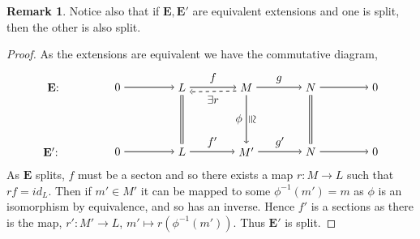 \documentclass[11.5pt, twoside, a4paper, titlepage]{report}
\theoremstyle{definition}
\newtheorem{rem}[mydef]{Remark}
\theoremstyle{plain}
\begin{document}
\begin{rem}
Notice also that if $\mathbf{E}, \mathbf{E'}$ are equivalent extensions and one is split, then the other is also split.
\end{rem}
\begin{proof}
As the extensions are equivalent we have the commutative diagram,
\begin{equation*}
\begin{tikzpicture}[->,-latex, auto, main path/.style={->, semithick}, main node/.style={}]
\node	[main node]		(1) at (0,0)		{$\mathbf{E}$:};
\node	[main node]		(2) at (2,0)		{$0$};
\node	[main node]		(3) at (4,0)		{$L$};
\node [main node]		(4) at (6,0)		{$M$};
\node [main node]		(5) at (8,0)		{$N$};
\node	[main node]		(11) at (10,0)	{$0$};

\node	[main node]		(6) at (0,-2)		{$\mathbf{E'}$: \quad};
\node	[main node]		(7) at (2,-2)		{$0$};
\node	[main node]		(8) at (4,-2)		{$L$};
\node [main node]		(9) at (6,-2)		{$M'$};
\node [main node]		(10) at (8,-2)	{$N$};
\node [main node]		(13) at (10,-2)	{$0$};

\draw (2) edge [main path] node [auto] {$$} (3);
\path (3.0) edge [main path] node [auto] {$f$} (4.180);
\path (4.200) edge [dashed, ->, semithick] node [auto] {$\exists r$} (3.330);
\draw (4) edge [main path] node [auto] {$g$} (5);
\draw (5) edge [main path] (11);


\draw (7) edge [main path] node [auto] {$$} (8);
\draw (8) edge [main path] node [auto] {$f'$} (9);
\draw (9) edge [main path] node [auto] {$g'$} (10);
\draw (10) edge [main path] (13);

\draw (3) edge [-, semithick, double, double distance=1.5pt] (8);
\draw (4) edge [main path] node [above,sloped,inner sep=1pt] {$\cong$} node [auto, swap] {$\phi$} (9);
\draw (5) edge [-, semithick, double, double distance=1.5pt](10);
\end{tikzpicture}
\end{equation*}
As $\mathbf{E}$ splits, $f$ must be a secton and so there exists a map $r: M \to L$ such that $rf=id_L$. Then if $m'\in M'$ it can be mapped to some $\phi^{-1}(m')=m$ as $\phi$ is an isomorphism by equivalence, and so has an inverse. Hence $f'$ is a sections as there is the map, $r':M' \to L$, $m' \mapsto r(\phi^{-1}(m'))$. Thus $\mathbf{E'}$ is split.
\end{proof}
\end{document}
